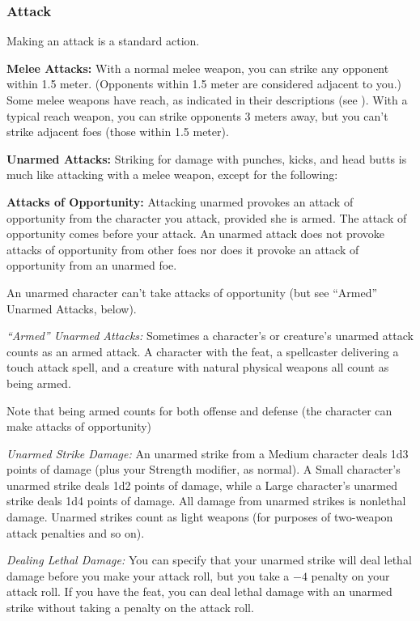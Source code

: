 \subsubsection{Attack}
Making an attack is a standard action.

\textbf{Melee Attacks:} With a normal melee weapon, you can strike any opponent within 1.5 meter. (Opponents within 1.5 meter are considered adjacent to you.) Some melee weapons have reach, as indicated in their descriptions (see ). With a typical reach weapon, you can strike opponents 3 meters away, but you can't strike adjacent foes (those within 1.5 meter).

\textbf{Unarmed Attacks:} Striking for damage with punches, kicks, and head butts is much like attacking with a melee weapon, except for the following:

\textbf{Attacks of Opportunity:} Attacking unarmed provokes an attack of opportunity from the character you attack, provided she is armed. The attack of opportunity comes before your attack. An unarmed attack does not provoke attacks of opportunity from other foes nor does it provoke an attack of opportunity from an unarmed foe.

An unarmed character can't take attacks of opportunity (but see ``Armed'' Unarmed Attacks, below).

\textit{``Armed'' Unarmed Attacks:} Sometimes a character's or creature's unarmed attack counts as an armed attack. A character with the  feat, a spellcaster delivering a touch attack spell, and a creature with natural physical weapons all count as being armed.

Note that being armed counts for both offense and defense (the character can make attacks of opportunity)

\textit{Unarmed Strike Damage:} An unarmed strike from a Medium character deals 1d3 points of damage (plus your Strength modifier, as normal). A Small character's unarmed strike deals 1d2 points of damage, while a Large character's unarmed strike deals 1d4 points of damage. All damage from unarmed strikes is nonlethal damage. Unarmed strikes count as light weapons (for purposes of two-weapon attack penalties and so on).

\textit{Dealing Lethal Damage:} You can specify that your unarmed strike will deal lethal damage before you make your attack roll, but you take a $-4$ penalty on your attack roll. If you have the  feat, you can deal lethal damage with an unarmed strike without taking a penalty on the attack roll.

